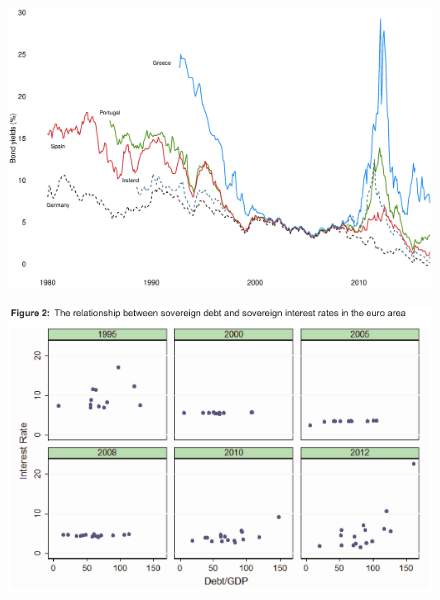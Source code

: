 \documentclass{beamer}
\begin{document}
\begin{frame}
  \begin{figure}
    \includegraphics[scale=.3]{bonds.eps}
  \end{figure}
\end{frame}

\begin{frame}
  \begin{figure}
    \includegraphics[scale=.9]{whelan.eps}
  \end{figure}
\end{frame}
\end{document}
